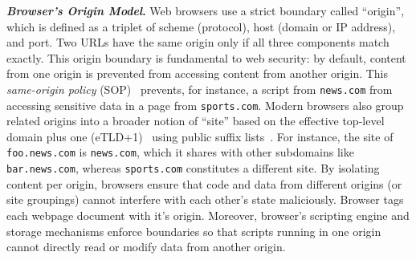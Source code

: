 \noindent \textbf{\textit{Browser's Origin Model}.} 
%
Web browsers use a strict boundary called ``origin'', which is defined as a triplet of scheme (protocol), host (domain or IP address), and port. 
%
Two URLs have the same origin only if all three components match exactly. 
%
%
This origin boundary is fundamental to web security: by default, content from one origin is prevented from accessing content from another origin. 
%
This \textit{same-origin policy} (SOP)~\cite{mdnSameoriginPolicySecurity2024} prevents, for instance, a script from \texttt{news.com} from accessing sensitive data in a page from \texttt{sports.com}.
%
Modern browsers also group related origins into a broader notion of ``site'' based on the effective top-level domain plus one (eTLD+1)~\cite{WebKitTrackingPrevention} using public suffix lists~\cite{mozillafoundationPublicSuffixList2007}.
%
For instance, the site of \texttt{foo.news.com} is \texttt{news.com}, which it shares with other subdomains like \texttt{bar.news.com}, whereas \texttt{sports.com} constitutes a different site.
%
By isolating content per origin, browsers ensure that code and data from different origins (or site groupings) cannot interfere with each other’s state maliciously.
%
%
Browser tags each webpage document with it's origin.
%
Moreover, browser’s scripting engine and storage mechanisms enforce boundaries so that scripts running in one origin cannot directly read or modify data from another origin.


